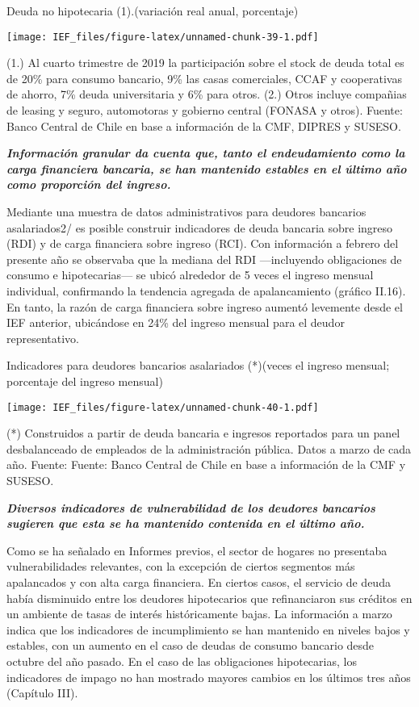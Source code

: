 \documentclass[
]{book}
\begin{document}
Deuda no hipotecaria (1).(variación real anual, porcentaje)

\texttt{[image: IEF\_files/figure-latex/unnamed-chunk-39-1.pdf]}

(1.) Al cuarto trimestre de 2019 la participación sobre el stock de deuda total es de 20\% para consumo bancario, 9\% las casas comerciales, CCAF y cooperativas de ahorro, 7\% deuda universitaria y 6\% para otros.
(2.) Otros incluye compañias de leasing y seguro, automotoras y gobierno central (FONASA y otros).
Fuente: Banco Central de Chile en base a información de la CMF, DIPRES y SUSESO.

\textbf{\emph{Información granular da cuenta que, tanto el endeudamiento como
la carga financiera bancaria, se han mantenido estables en el último
año como proporción del ingreso.}}

Mediante una muestra de datos administrativos para deudores bancarios
asalariados2/ es posible construir indicadores de deuda bancaria sobre ingreso
(RDI) y de carga financiera sobre ingreso (RCI). Con información a febrero del
presente año se observaba que la mediana del RDI ---incluyendo obligaciones
de consumo e hipotecarias--- se ubicó alrededor de 5 veces el ingreso mensual
individual, confirmando la tendencia agregada de apalancamiento (gráfico
II.16). En tanto, la razón de carga financiera sobre ingreso aumentó levemente
desde el IEF anterior, ubicándose en 24\% del ingreso mensual para el deudor
representativo.

Indicadores para deudores bancarios asalariados (*)(veces el ingreso mensual; porcentaje del ingreso mensual)

\texttt{[image: IEF\_files/figure-latex/unnamed-chunk-40-1.pdf]}

(*) Construidos a partir de deuda bancaria e ingresos reportados para un panel desbalanceado de empleados de la administración pública. Datos a marzo de cada año.
Fuente: Fuente: Banco Central de Chile en base a información de la CMF y SUSESO.

\textbf{\emph{Diversos indicadores de vulnerabilidad de los deudores bancarios
sugieren que esta se ha mantenido contenida en el último año.}}

Como se ha señalado en Informes previos, el sector de hogares no presentaba
vulnerabilidades relevantes, con la excepción de ciertos segmentos más
apalancados y con alta carga financiera. En ciertos casos, el servicio de deuda
había disminuido entre los deudores hipotecarios que refinanciaron sus créditos
en un ambiente de tasas de interés históricamente bajas. La información a
marzo indica que los indicadores de incumplimiento se han mantenido en
niveles bajos y estables, con un aumento en el caso de deudas de consumo
bancario desde octubre del año pasado. En el caso de las obligaciones
hipotecarias, los indicadores de impago no han mostrado mayores cambios en
los últimos tres años (Capítulo III).
\end{document}
